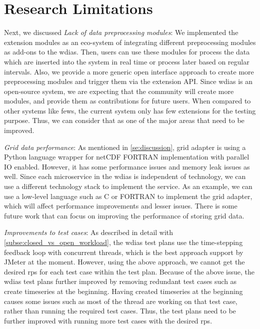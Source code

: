\section{Research Limitations}
\label{se:research_limitations}

Next, we discussed \emph{Lack of data preprocessing modules}:
We implemented the extension modules as an eco-system of integrating different preprocessing modules as add-ons to the \acrshort{wdias}. Then, users can use these modules for process the data which are inserted into the system in real time or process later based on regular intervals. Also, we provide a more generic open interface approach to create more preprocessing modules and trigger them via the extension API. Since \acrshort{wdias} is an open-source system, we are expecting that the community will create more modules, and provide them as contributions for future users. When compared to other systems like \acrshort{fews}, the current system only has few extensions for the testing purpose. Thus, we can consider that as one of the major areas that need to be improved.

\emph{Grid data performance}:
As mentioned in \cref{se:discussion}, grid adapter is using a Python language wrapper for netCDF FORTRAN implementation with parallel IO enabled. However, it has some performance issues and memory leak issues as well. Since each microservice in the \acrshort{wdias} is independent of technology, we can use a different technology stack to implement the service. As an example, we can use a low-level language such as C or FORTRAN to implement the grid adapter, which will affect performance improvements and lesser issues. There is some future work that can focus on improving the performance of storing grid data.

\emph{Improvements to test cases}:
As described in detail with \cref{subse:closed_vs_open_workload}, the \acrshort{wdias} test plans use the time-stepping feedback loop with concurrent threads, which is the best approach support by JMeter at the moment. However, using the above approach, we cannot get the desired \acrshort{rps} for each test case within the test plan.
Because of the above issue, the \acrshort{wdias} test plans further improved by removing redundant test cases such as create timeseries at the beginning. Having created timeseries at the beginning causes some issues such as most of the thread are working on that test case, rather than running the required test cases. Thus, the test plans need to be further improved with running more test cases with the desired \acrshort{rps}.

